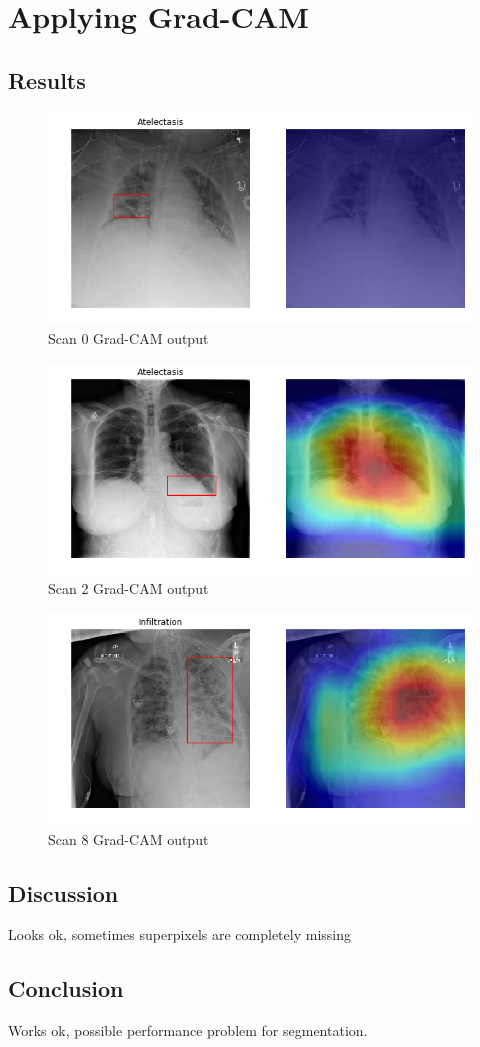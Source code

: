 \section{Applying Grad-CAM}

\subsection{Results}
\begin{figure}[H]
\centering
\caption{Scan 0 Grad-CAM output}
\includegraphics[width=12cm]{chapters/03_classification/images/grad-cam_0.png}
\end{figure}

\begin{figure}[H]
\centering
\caption{Scan 2 Grad-CAM output}
\includegraphics[width=12cm]{chapters/03_classification/images/grad-cam_2.png}
\end{figure}

\begin{figure}[H]
\centering
\caption{Scan 8 Grad-CAM output}
\includegraphics[width=12cm]{chapters/03_classification/images/grad-cam_8.png}
\end{figure}

\subsection{Discussion}
Looks ok, sometimes superpixels are completely missing

\subsection{Conclusion}
Works ok, possible performance problem for segmentation.
